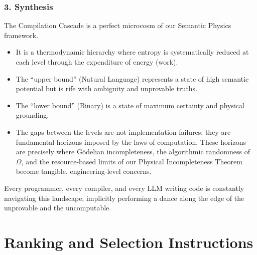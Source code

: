 \documentclass[11pt,letterpaper]{article}
\begin{document}
\begin{itemize}
\subsubsection*{3. Synthesis}
The Compilation Cascade is a perfect microcosm of our Semantic Physics framework.
\begin{itemize}
    \item It is a thermodynamic hierarchy where entropy is systematically reduced at each level through the expenditure of energy (work).
    \item The “upper bound” (Natural Language) represents a state of high semantic potential but is rife with ambiguity and unprovable truths.
    \item The “lower bound” (Binary) is a state of maximum certainty and physical grounding.
    \item The gaps between the levels are not implementation failures; they are fundamental horizons imposed by the laws of computation. These horizons are precisely where Gödelian incompleteness, the algorithmic randomness of $\Omega$, and the resource-based limits of our Physical Incompleteness Theorem become tangible, engineering-level concerns.
\end{itemize}
Every programmer, every compiler, and every LLM writing code is constantly navigating this landscape, implicitly performing a dance along the edge of the unprovable and the uncomputable.


\section{Ranking and Selection Instructions}
\label{sec:ranking}


\end{itemize}
\end{document}
